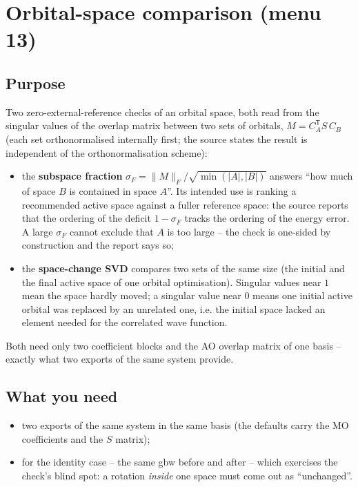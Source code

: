 \chapter{Orbital-space comparison (menu 13)}
\label{ch:menu13}

\section{Purpose}

Two zero-external-reference checks of an orbital space, both read from the
singular values of the overlap matrix between two sets of orbitals,
$M = C_A^{\mathsf{T}} S\, C_B$ (each set orthonormalised internally first; the
source states the result is independent of the orthonormalisation scheme):

\begin{itemize}
  \item the \textbf{subspace fraction}
    $\sigma_F = \lVert M \rVert_F / \sqrt{\min(|A|, |B|)}$ answers ``how much of
    space $B$ is contained in space $A$''. Its intended use is ranking a
    recommended active space against a fuller reference space: the source
    reports that the ordering of the deficit $1 - \sigma_F$ tracks the ordering
    of the energy error. A large $\sigma_F$ cannot exclude that $A$ is too
    large -- the check is one-sided by construction and the report says so;
  \item the \textbf{space-change SVD} compares two sets of the same size (the
    initial and the final active space of one orbital optimisation). Singular
    values near $1$ mean the space hardly moved; a singular value near $0$
    means one initial active orbital was replaced by an unrelated one, i.e. the
    initial space lacked an element needed for the correlated wave function.
\end{itemize}

Both need only two coefficient blocks and the AO overlap matrix of one basis --
exactly what two  exports of the same system provide.

\section{What you need}

\begin{itemize}
  \item two  exports of the same system in the same basis
    (the defaults carry the MO coefficients and the $S$ matrix);
  \item for the identity case -- the same gbw before and after
     -- which exercises the check's blind spot: a rotation
    \emph{inside} one space must come out as ``unchanged''.
\end{itemize}

